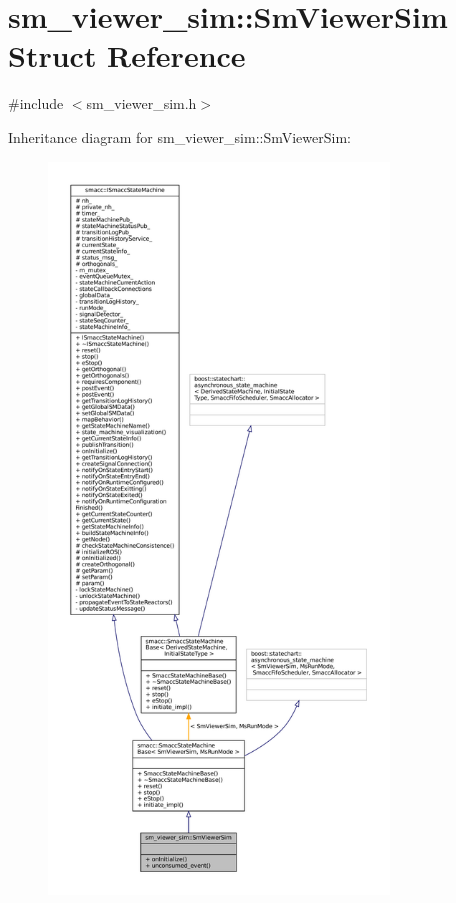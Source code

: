\hypertarget{structsm__viewer__sim_1_1SmViewerSim}{}\section{sm\+\_\+viewer\+\_\+sim\+:\+:Sm\+Viewer\+Sim Struct Reference}
\label{structsm__viewer__sim_1_1SmViewerSim}


{\ttfamily \#include $<$sm\+\_\+viewer\+\_\+sim.\+h$>$}



Inheritance diagram for sm\+\_\+viewer\+\_\+sim\+:\+:Sm\+Viewer\+Sim\+:
\nopagebreak
\begin{figure}[H]
\begin{center}
\leavevmode
\includegraphics[height=550pt]{structsm__viewer__sim_1_1SmViewerSim__inherit__graph}
\end{center}
\end{figure}


